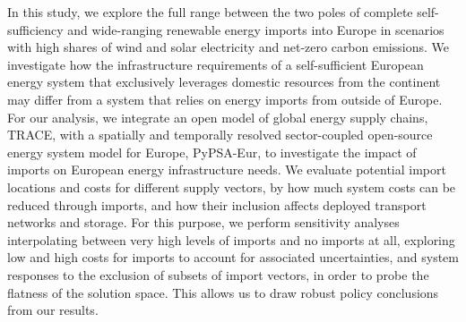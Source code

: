 In this study, we explore the full range between the two poles of complete
self-sufficiency and wide-ranging renewable energy imports into Europe in
scenarios with high shares of wind and solar electricity and net-zero carbon
emissions. We investigate how the infrastructure requirements of a
self-sufficient European energy system that exclusively leverages domestic
resources from the continent may differ from a system that relies on energy
imports from outside of Europe. For our analysis, we integrate an open model of
global energy supply chains, TRACE,\cite{hamppImportOptions2023} with a
spatially and temporally resolved sector-coupled open-source energy system model
for Europe, PyPSA-Eur,\cite{PyPSAEurSecSectorCoupled} to investigate the impact
of imports on European energy infrastructure needs. We evaluate potential import
locations and costs for different supply vectors, by how much system costs can
be reduced through imports, and how their inclusion affects deployed transport
networks and storage. For this purpose, we perform sensitivity analyses
interpolating between very high levels of imports and no imports at all,
exploring low and high costs for imports to account for associated
uncertainties, and system responses to the exclusion of subsets of import
vectors, in order to probe the flatness of the solution space. This allows us to
draw robust policy conclusions from our results.


